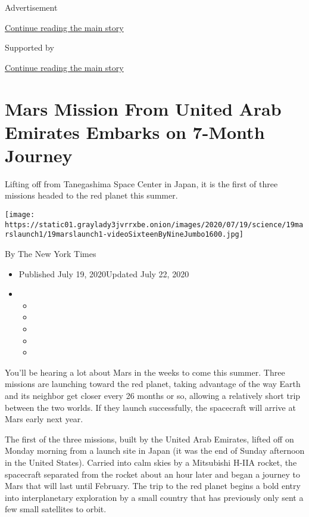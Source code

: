 Advertisement

\protect\hyperlink{after-top}{Continue reading the main story}

Supported by

\protect\hyperlink{after-sponsor}{Continue reading the main story}

\hypertarget{mars-mission-from-united-arab-emirates-embarks-on-7-month-journey}{%
\section{Mars Mission From United Arab Emirates Embarks on 7-Month
Journey}\label{mars-mission-from-united-arab-emirates-embarks-on-7-month-journey}}

Lifting off from Tanegashima Space Center in Japan, it is the first of
three missions headed to the red planet this summer.

\texttt{[image: https://static01.graylady3jvrrxbe.onion/images/2020/07/19/science/19marslaunch1/19marslaunch1-videoSixteenByNineJumbo1600.jpg]}

By The New York Times

\begin{itemize}
\item
  Published July 19, 2020Updated July 22, 2020
\item
  \begin{itemize}
  \item
  \item
  \item
  \item
  \item
  \end{itemize}
\end{itemize}

You'll be hearing a lot about Mars in the weeks to come this summer.
Three missions are launching toward the red planet, taking advantage of
the way Earth and its neighbor get closer every 26 months or so,
allowing a relatively short trip between the two worlds. If they launch
successfully, the spacecraft will arrive at Mars early next year.

The first of the three missions, built by the United Arab Emirates,
lifted off on Monday morning from a launch site in Japan (it was the end
of Sunday afternoon in the United States). Carried into calm skies by a
Mitsubishi H-IIA rocket, the spacecraft separated from the rocket about
an hour later and began a journey to Mars that will last until February.
The trip to the red planet begins a bold entry into interplanetary
exploration by a small country that has previously only sent a few small
satellites to orbit.


